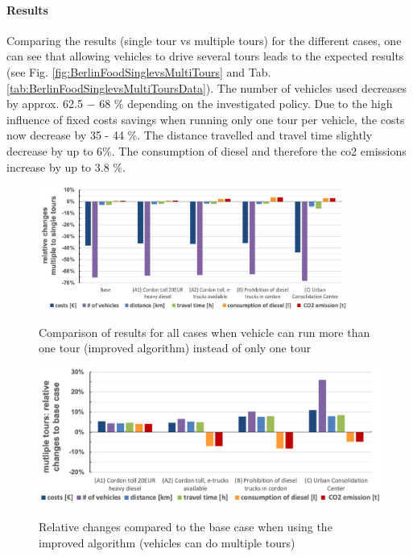 \vspace{-2mm} 
\paragraph*{Results}
Comparing the results (single tour vs multiple tours) for the different cases, one can see that allowing vehicles to drive several tours leads to the expected results (see Fig. \ref{fig:BerlinFoodSinglevsMultiTours} and Tab. \ref{tab:BerlinFoodSinglevsMultiToursData}). The number of vehicles used decreases by approx. 62.5 $-$ 68 \% depending on the investigated policy. Due to the high influence of fixed costs savings when running only one tour per vehicle, the costs now decrease by 35 - 44 \%. The distance travelled and travel time slightly decrease by up to 6\%. The consumption of diesel and therefore the \gls{co2} emissions increase by up to 3.8 \%. 

\begin{figure}[t]%
\begin{minipage}[t]{0.45\textwidth}
\centerline{\includegraphics[width=0.9\textwidth]{elektrifizierung/shipments/figs/BerlinFoodSinglevsMultiTours}}
\caption{Comparison of results for all cases when vehicle can run more than one tour (improved algorithm) instead of only one tour}
\label{fig:BerlinFoodSinglevsMultiTours}
\end{minipage}
\hspace{0.05\textwidth}
\begin{minipage}[t]{0.45\textwidth}
\centerline{\includegraphics[width=\textwidth]{elektrifizierung/shipments/figs/BerlinFoodMultipleTours}}
\caption{Relative changes compared to the base case when using the improved algorithm (vehicles can do multiple tours)}\vspace*{-6pt}
\label{fig:FoodMutlipleTours}
\end{minipage}
\vspace{-5mm} 
\end{figure}

